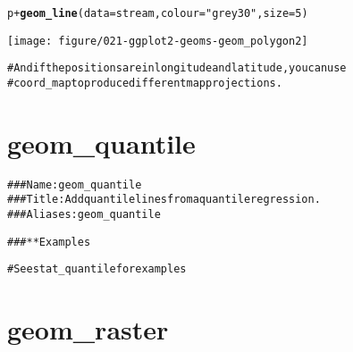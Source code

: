 \documentclass[a4paper,titlepage]{tufte-handout}\usepackage{graphicx, color}
\makeatletter
\def\maxwidth{ %
  \ifdim\Gin@nat@width>\linewidth
    \linewidth
  \else
    \Gin@nat@width
  \fi
}
\newcommand{\hlfunctioncall}[1]{\textcolor[rgb]{0.501960784313725,0,0.329411764705882}{\textbf{#1}}}%
\newcommand{\hlstring}[1]{\textcolor[rgb]{0.6,0.6,1}{#1}}%
\newcommand{\hlcomment}[1]{\textcolor[rgb]{0.180392156862745,0.6,0.341176470588235}{#1}}%
\newenvironment{kframe}{%
 \def\at@end@of@kframe{}%
 \ifinner\ifhmode%
  \def\at@end@of@kframe{\end{minipage}}%
  \begin{minipage}{\columnwidth}%
 \fi\fi%
 \def\FrameCommand##1{\hskip\@totalleftmargin \hskip-\fboxsep
 \colorbox{shadecolor}{##1}\hskip-\fboxsep
     \hskip-\linewidth \hskip-\@totalleftmargin \hskip\columnwidth}%
 \MakeFramed {\advance\hsize-\width
   \@totalleftmargin\z@ \linewidth\hsize
   \@setminipage}}%
 {\par\unskip\endMakeFramed%
 \at@end@of@kframe}
\newenvironment{knitrout}{}{} %
\makeatother
\begin{document}
\begin{knitrout}
\begin{kframe}
\begin{alltt}
p + \hlfunctioncall{geom_line}(data = stream, colour=\hlstring{"grey30"}, size = 5)
\end{alltt}
\end{kframe}
\texttt{[image: figure/021-ggplot2-geoms-geom\_polygon2]} 
\begin{kframe}\begin{alltt}

\hlcomment{# And if the positions are in longitude and latitude, you can use}
\hlcomment{# coord_map to produce different map projections.}


\end{alltt}
\end{kframe}
\end{knitrout}



\section{geom\_quantile}

\begin{knitrout}
\color{fgcolor}\begin{kframe}
\begin{alltt}
\hlcomment{### Name: geom_quantile}
\hlcomment{### Title: Add quantile lines from a quantile regression.}
\hlcomment{### Aliases: geom_quantile}

\hlcomment{### ** Examples}

\hlcomment{# See stat_quantile for examples}



\end{alltt}
\end{kframe}
\end{knitrout}



\section{geom\_raster}
\end{document}
